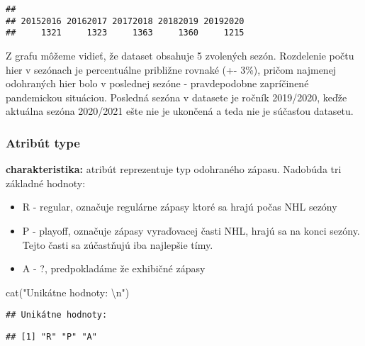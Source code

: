 \documentclass[
]{article}
\newenvironment{Shaded}{\begin{snugshade}}{\end{snugshade}}
\newcommand{\FunctionTok}[1]{\textcolor[rgb]{0.00,0.00,0.00}{#1}}
\newcommand{\NormalTok}[1]{#1}
\newcommand{\SpecialCharTok}[1]{\textcolor[rgb]{0.00,0.00,0.00}{#1}}
\newcommand{\StringTok}[1]{\textcolor[rgb]{0.31,0.60,0.02}{#1}}
\providecommand{\tightlist}{%
  \setlength{\itemsep}{0pt}\setlength{\parskip}{0pt}}
\begin{document}
\begin{verbatim}
## 
## 20152016 20162017 20172018 20182019 20192020 
##     1321     1323     1363     1360     1215
\end{verbatim}

Z grafu môžeme vidieť, že dataset obsahuje 5 zvolených sezón. Rozdelenie
počtu hier v sezónach je percentuálne približne rovnaké (+- 3\%), pričom
najmenej odohraných hier bolo v poslednej sezóne - pravdepodobne
zapríčinené pandemickou situáciou. Posledná sezóna v datasete je ročník
2019/2020, keďže aktuálna sezóna 2020/2021 ešte nie je ukončená a teda
nie je súčasťou datasetu.

\hypertarget{atribuxfat-type}{%
\subsubsection{Atribút type}\label{atribuxfat-type}}

\textbf{charakteristika:} atribút reprezentuje typ odohraného zápasu.
Nadobúda tri základné hodnoty:

\begin{itemize}
\tightlist
\item
  R - regular, označuje regulárne zápasy ktoré sa hrajú počas NHL sezóny
\item
  P - playoff, označuje zápasy vyraďovacej časti NHL, hrajú sa na konci
  sezóny. Tejto časti sa zúčastňujú iba najlepšie tímy.
\item
  A - ?, predpokladáme že exhibičné zápasy
\end{itemize}

\begin{Shaded}
\begin{Highlighting}[]
\FunctionTok{cat}\NormalTok{(}\StringTok{"Unikátne hodnoty: }\SpecialCharTok{\textbackslash{}n}\StringTok{"}\NormalTok{)}
\end{Highlighting}
\end{Shaded}

\begin{verbatim}
## Unikátne hodnoty:
\end{verbatim}

\begin{Shaded}
\end{Shaded}

\begin{verbatim}
## [1] "R" "P" "A"
\end{verbatim}
\end{document}
